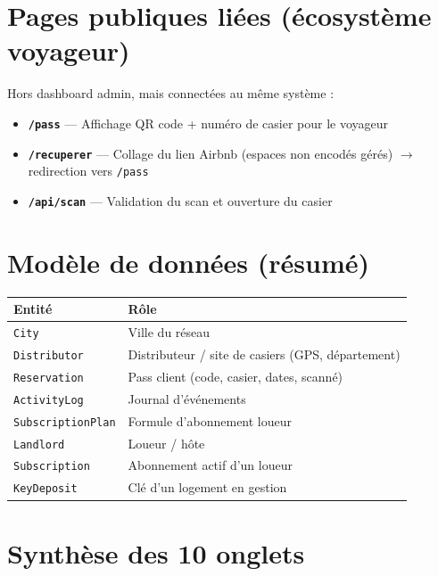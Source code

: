 \documentclass[11pt,a4paper]{article}
\begin{document}
\section{Pages publiques liées (écosystème voyageur)}

Hors dashboard admin, mais connectées au même système :

\begin{itemize}
  \item \textbf{\texttt{/pass}} — Affichage QR code + numéro de casier pour le voyageur
  \item \textbf{\texttt{/recuperer}} — Collage du lien Airbnb (espaces non encodés gérés) $\rightarrow$ redirection vers \texttt{/pass}
  \item \textbf{\texttt{/api/scan}} — Validation du scan et ouverture du casier
\end{itemize}

\section{Modèle de données (résumé)}

\begin{center}
\small
\begin{tabular}{ll}
  \toprule
  \textbf{Entité} & \textbf{Rôle} \\
  \midrule
  \texttt{City} & Ville du réseau \\
  \texttt{Distributor} & Distributeur / site de casiers (GPS, département) \\
  \texttt{Reservation} & Pass client (code, casier, dates, scanné) \\
  \texttt{ActivityLog} & Journal d'événements \\
  \texttt{SubscriptionPlan} & Formule d'abonnement loueur \\
  \texttt{Landlord} & Loueur / hôte \\
  \texttt{Subscription} & Abonnement actif d'un loueur \\
  \texttt{KeyDeposit} & Clé d'un logement en gestion \\
  \bottomrule
\end{tabular}
\end{center}

\section{Synthèse des 10 onglets}
\end{document}
